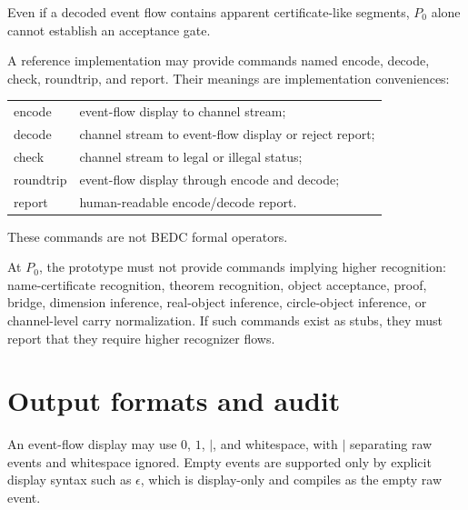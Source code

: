 \begin{corollary}
\label{cor:minimal-prototype-output-not-accepted}
Even if a decoded event flow contains apparent certificate-like segments, $P_0$ alone cannot establish an acceptance gate.
\end{corollary}

\begin{definition}
\label{def:minimal-prototype-allowed-cli}
A reference implementation may provide commands named encode, decode, check, roundtrip, and report. Their meanings are implementation conveniences:
\begin{center}
\begin{tabular}{ll}
encode & event-flow display to channel stream;\\
decode & channel stream to event-flow display or reject report;\\
check & channel stream to legal or illegal status;\\
roundtrip & event-flow display through encode and decode;\\
report & human-readable encode/decode report.
\end{tabular}
\end{center}
These commands are not BEDC formal operators.
\end{definition}

\begin{definition}
\label{def:minimal-prototype-forbidden-cli}
At $P_0$, the prototype must not provide commands implying higher recognition: name-certificate recognition, theorem recognition, object acceptance, proof, bridge, dimension inference, real-object inference, circle-object inference, or channel-level carry normalization. If such commands exist as stubs, they must report that they require higher recognizer flows.
\end{definition}

\section{Output formats and audit}
\label{sec:minimal-prototype-output-formats-audit}

\begin{definition}
\label{def:minimal-prototype-event-flow-display-format}
An event-flow display may use $0$, $1$, $\mid$, and whitespace, with $\mid$ separating raw events and whitespace ignored. Empty events are supported only by explicit display syntax such as $\epsilon$, which is display-only and compiles as the empty raw event.
\end{definition}

